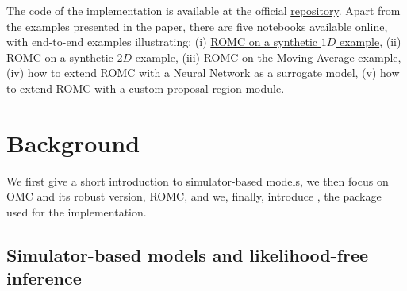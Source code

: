 \documentclass[article]{jss}
\begin{document}
The code of the implementation is available at the official  \href{https://github.com/elfi-dev/elfi}{repository}. Apart
from the examples presented in the paper, there are five  notebooks available online, with end-to-end examples
illustrating:
(i) \href{https://colab.research.google.com/drive/1lGRp0XrNfZ64NN0ASB_tYEKowXwlveDC?usp=sharing}{ROMC on a synthetic \(1D\) example},
(ii) \href{https://colab.research.google.com/drive/1Fof_WmCi1YizzSI_63aEsbLXsno5gSZ3?usp=sharing}{ROMC on a synthetic \(2D\) example},
(iii) \href{https://colab.research.google.com/drive/1nkdACQ370SSc0KB1bHv4sBRaxMlMqoNH?usp=sharing}{ROMC on the Moving Average example},
(iv) \href{https://colab.research.google.com/drive/1_jHVxPSH3XcNOORZJpLU0SPzs0PF8CQ5?usp=sharing}{how to extend ROMC with a Neural Network as a surrogate model},
(v) \href{https://colab.research.google.com/drive/1RzB-V1QueP1y1nyzv_VOqR1nVz3DUH3v?usp=sharing}{how to extend ROMC with a custom proposal region module}.




\section{Background}

We first give a short introduction to simulator-based models, we then
focus on OMC and its robust version, ROMC, and we, finally, introduce
, the  package used for the implementation.

\subsection{Simulator-based models and likelihood-free inference}
\end{document}
